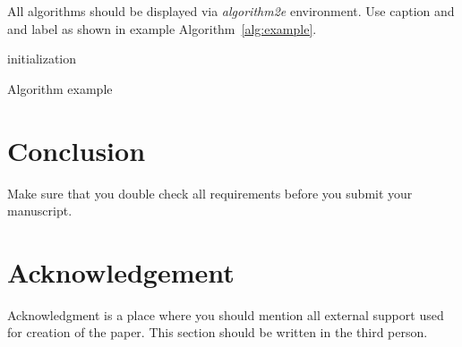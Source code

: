 \documentclass{pjtemplate}
\begin{document}
All algorithms should be displayed via \emph{algorithm2e} environment. Use caption and and label as shown in example Algorithm~\ref{alg:example}.

\begin{algorithm}[H]
\SetAlgoLined
{}
 initialization\;
 \caption{Algorithm example}\label{alg:example}
\end{algorithm}




\section{Conclusion}

Make sure that you double check all requirements before you submit your manuscript.


\section*{Acknowledgement}

Acknowledgment is a place where you should mention all external support used for creation of the paper. This section should be written in the third person.




\end{document}
